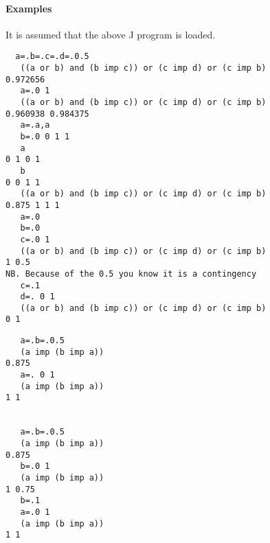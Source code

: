 \documentclass[12pt,a4paper]{article}
\begin{document}
\paragraph{Examples}

It is assumed that the above J program is loaded.
\begin{verbatim}
  a=.b=.c=.d=.0.5
   ((a or b) and (b imp c)) or (c imp d) or (c imp b)
0.972656
   a=.0 1
   ((a or b) and (b imp c)) or (c imp d) or (c imp b)
0.960938 0.984375
   a=.a,a
   b=.0 0 1 1
   a
0 1 0 1
   b
0 0 1 1
   ((a or b) and (b imp c)) or (c imp d) or (c imp b)
0.875 1 1 1
   a=.0
   b=.0
   c=.0 1
   ((a or b) and (b imp c)) or (c imp d) or (c imp b)
1 0.5
NB. Because of the 0.5 you know it is a contingency
   c=.1
   d=. 0 1
   ((a or b) and (b imp c)) or (c imp d) or (c imp b)
0 1
\end{verbatim}

\begin{verbatim}
   a=.b=.0.5
   (a imp (b imp a))
0.875
   a=. 0 1
   (a imp (b imp a))
1 1


   a=.b=.0.5
   (a imp (b imp a))
0.875
   b=.0 1
   (a imp (b imp a))
1 0.75
   b=.1
   a=.0 1
   (a imp (b imp a))
1 1

\end{verbatim}
\end{document}
